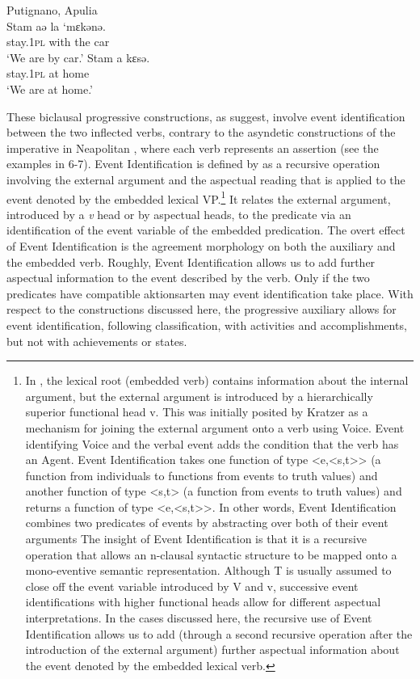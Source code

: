 \documentclass[output=paper]{langsci/langscibook}
\begin{document}
\ea%
    Putignano, Apulia\label{ex:lorusso:37}\\
    \ea
    \gll Stam    aə  la  ‘mɛkənə.\\
         stay.\textsc{1pl}   with  the  car\\
    \glt ‘We are by car.’
    \ex
    \gll Stam     a   kɛsə.\\
         stay.\textsc{1pl}   at  home \\
    \glt ‘We are at home.’
    \z
\z

These biclausal progressive constructions, as \citet{Manzini2005} suggest, involve event identification between the two inflected verbs, contrary to the asyndetic constructions of the imperative in Neapolitan \citep{Ledgeway1997}, where each verb represents an assertion (see the examples in 6-7). Event Identification is defined by \citet{Kratzer1996} as a recursive operation involving the external argument and the aspectual reading that is applied to the event denoted by the embedded lexical VP.\footnote{In \citet{Kratzer1996}, the lexical root (embedded verb) contains information about the internal argument, but the external argument is introduced by a hierarchically superior functional head v. This was initially posited by Kratzer as a mechanism for joining the external argument onto a verb using Voice. Event identifying Voice and the verbal event adds the condition that the verb has an Agent. Event Identification takes one function of type <e,<s,t>> (a function from individuals to functions from events to truth values) and another function of type <s,t> (a function from events to truth values) and returns a function of type <e,<s,t>>. In other words, Event Identification combines two predicates of events by abstracting over both of their event arguments The insight of  Event Identification is that it is a recursive operation that allows an n-clausal syntactic structure to be mapped onto a mono-eventive semantic representation. Although T is usually assumed to close off the event variable introduced by V and v, successive event identifications with higher functional heads allow for different aspectual interpretations. In the cases discussed here, the recursive use of Event Identification allows us to add (through a second recursive operation after the introduction of the external argument) further aspectual information about the event denoted by the embedded lexical verb.} It relates the external argument, introduced by a \textit{v} head or by aspectual heads, to the predicate via an identification of the event variable of the embedded predication. The overt effect of Event Identification is the agreement morphology on both the auxiliary and the embedded verb. Roughly, Event Identification allows us to add further aspectual information to the event described by the verb. Only if the two predicates have compatible aktionsarten may event identification take place. With respect to the constructions discussed here, the progressive auxiliary allows for event identification, following  classification, with activities and accomplishments, but not with achievements or states.
\end{document}
